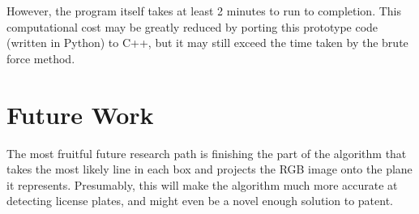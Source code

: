 \documentclass{article}
\begin{document}
However, the program itself takes at least 2 minutes to run to completion. This computational cost may be greatly reduced by porting this prototype code (written in Python) to C++, but it may still exceed the time taken by the brute force method. 

\section{Future Work}
The most fruitful future research path is finishing the part of the algorithm that takes the most likely line in each box and projects the RGB image onto the plane it represents. Presumably, this will make the algorithm much more accurate at detecting license plates, and might even be a novel enough solution to patent. 
 
\end{document}
